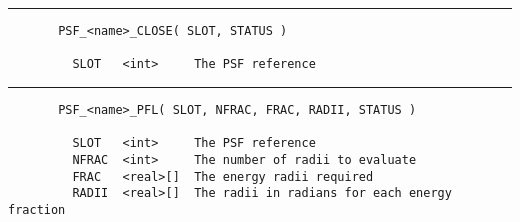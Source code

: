 \rule{\textwidth}{0.5mm}
\begin{verbatim}
       PSF_<name>_CLOSE( SLOT, STATUS )

         SLOT   <int>     The PSF reference
\end{verbatim}

\rule{\textwidth}{0.5mm}
\begin{verbatim}
       PSF_<name>_PFL( SLOT, NFRAC, FRAC, RADII, STATUS )

         SLOT   <int>     The PSF reference
         NFRAC  <int>     The number of radii to evaluate
         FRAC   <real>[]  The energy radii required
         RADII  <real>[]  The radii in radians for each energy fraction
\end{verbatim}


